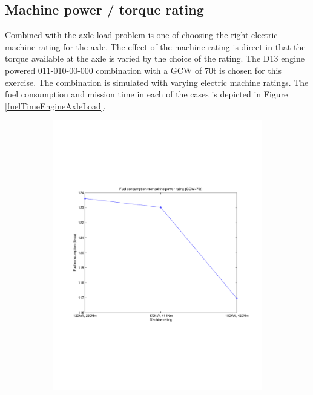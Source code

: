 \documentclass{article}
\begin{document}
\subsection{Machine power / torque rating}

Combined with the axle load problem is one of choosing the right electric machine rating for the axle. The effect of the machine rating is direct in that the torque available at the axle is varied by the choice of the rating. The D13 engine powered 011-010-00-000 combination with a GCW of 70t is chosen for this exercise. The combination is simulated with varying electric machine ratings. The fuel consumption and mission time in each of the cases is depicted in Figure \ref{fuelTimeEngineAxleLoad}.\\

\begin{figure}[h!]
\begin{subfigure}{.5\textwidth}
	\centering
	\includegraphics[width=\linewidth, clip=true, trim=45 185 65 206]{Figures/Effect_of_machine_power_rating/Fuel_consumption_vs_machine_power_rating.pdf}

\end{subfigure}
\end{figure}
\end{document}
